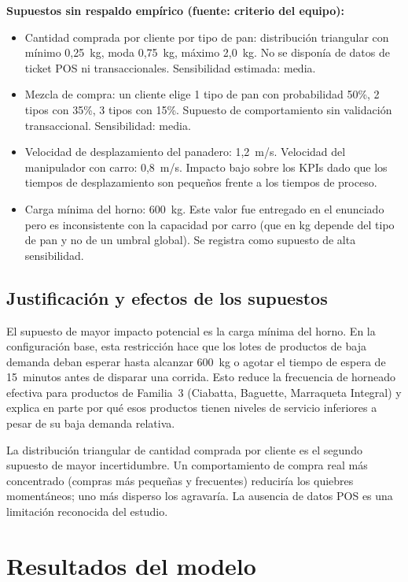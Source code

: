 \documentclass[12pt]{article}
\begin{document}
\textbf{Supuestos sin respaldo empírico (fuente: criterio del equipo):}
\begin{itemize}
  \item Cantidad comprada por cliente por tipo de pan: distribución triangular con mínimo 0,25~kg, moda 0,75~kg, máximo 2,0~kg. No se disponía de datos de ticket POS ni transaccionales. Sensibilidad estimada: media.
  \item Mezcla de compra: un cliente elige 1 tipo de pan con probabilidad 50\%, 2 tipos con 35\%, 3 tipos con 15\%. Supuesto de comportamiento sin validación transaccional. Sensibilidad: media.
  \item Velocidad de desplazamiento del panadero: 1,2~m/s. Velocidad del manipulador con carro: 0,8~m/s. Impacto bajo sobre los KPIs dado que los tiempos de desplazamiento son pequeños frente a los tiempos de proceso.
  \item Carga mínima del horno: 600~kg. Este valor fue entregado en el enunciado pero es inconsistente con la capacidad por carro (que en kg depende del tipo de pan y no de un umbral global). Se registra como supuesto de alta sensibilidad.
\end{itemize}

\subsection{Justificación y efectos de los supuestos}

El supuesto de mayor impacto potencial es la carga mínima del horno. En la configuración base, esta restricción hace que los lotes de productos de baja demanda deban esperar hasta alcanzar 600~kg o agotar el tiempo de espera de 15~minutos antes de disparar una corrida. Esto reduce la frecuencia de horneado efectiva para productos de Familia~3 (Ciabatta, Baguette, Marraqueta Integral) y explica en parte por qué esos productos tienen niveles de servicio inferiores a pesar de su baja demanda relativa.

La distribución triangular de cantidad comprada por cliente es el segundo supuesto de mayor incertidumbre. Un comportamiento de compra real más concentrado (compras más pequeñas y frecuentes) reduciría los quiebres momentáneos; uno más disperso los agravaría. La ausencia de datos POS es una limitación reconocida del estudio.

\newpage
\section{Resultados del modelo}
\label{sec:resultados}
\end{document}
